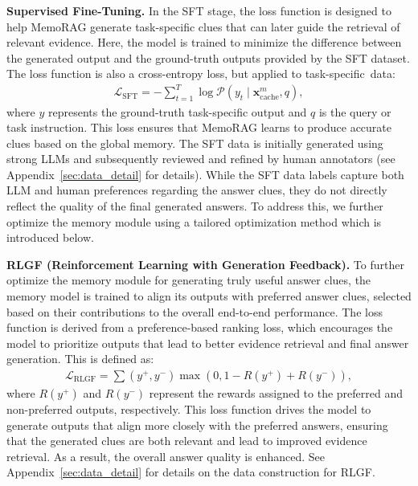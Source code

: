 \documentclass[sigconf]{acmart}
\begin{document}
\textbf{Supervised Fine-Tuning.}
In the SFT stage, the loss function is designed to help MemoRAG generate task-specific clues that can later guide the retrieval of relevant evidence. Here, the model is trained to minimize the difference between the generated output and the ground-truth outputs provided by the SFT dataset. The loss function is also a cross-entropy loss, but applied to task-specific~data:
\begin{align}
    \mathcal{L}_{\text{SFT}} = - \sum_{t=1}^{T} \log \mathcal{P}(y_t \mid \bm{x}^m_{\text{cache}}, q),
\end{align}
where $y$ represents the ground-truth task-specific output and $q$ is the query or task instruction. This loss ensures that MemoRAG learns to produce accurate clues based on the global memory. The SFT data is initially generated using strong LLMs and subsequently reviewed and refined by human annotators (see Appendix~\ref{sec:data_detail} for details). While the SFT data labels capture both LLM and human preferences regarding the answer clues, they do not directly reflect the quality of the final generated answers. To address this, we further optimize the memory module using a tailored optimization method which is introduced below.

\textbf{RLGF (Reinforcement Learning with Generation Feedback).}
To further optimize the memory module for generating truly useful answer clues, the memory model is trained to align its outputs with preferred answer clues, selected based on their contributions to the overall end-to-end performance. The loss function is derived from a preference-based ranking loss, which encourages the model to prioritize outputs that lead to better evidence retrieval and final answer generation. This is defined as:
\begin{align}
\mathcal{L}_{\text{RLGF}} = \sum{(y^+, y^-)} \max\left(0, 1 - R(y^+) + R(y^-)\right),
\end{align}
where $R(y^+)$ and $R(y^-)$ represent the rewards assigned to the preferred and non-preferred outputs, respectively. This loss function drives the model to generate outputs that align more closely with the preferred answers, ensuring that the generated clues are both relevant and lead to improved evidence retrieval. As a result, the overall answer quality is enhanced. See Appendix~\ref{sec:data_detail} for details on the data construction for RLGF.
\end{document}
